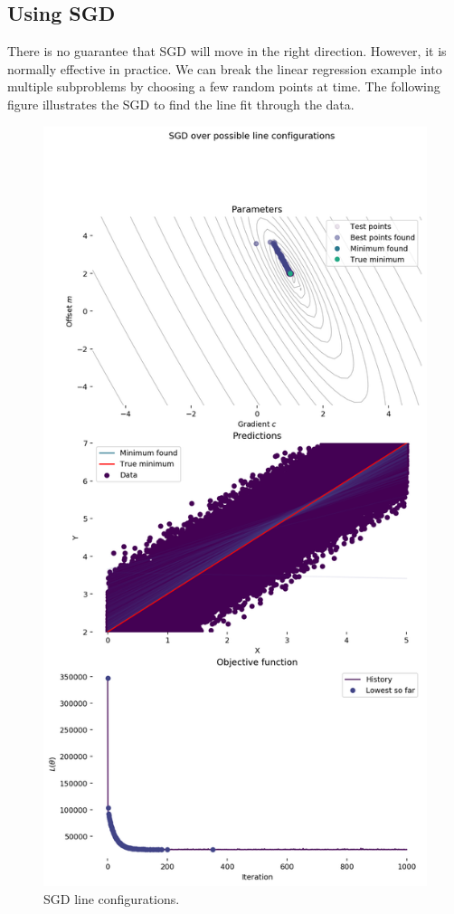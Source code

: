 \documentclass[a4paper, openany]{memoir}
\begin{document}
\subsection{Using SGD}
There is no guarantee that SGD will move in the right direction. However, it is normally effective in practice. We can break the linear regression example into multiple subproblems by choosing a few random points at time. The following figure illustrates the SGD to find the line fit through the data.
\begin{figure}[H]
    \centering
    \includegraphics[scale=0.5]{src/4.31 stochastic gradient descent line configurations.png}
    \caption{SGD line configurations.}
\end{figure}
\end{document}
